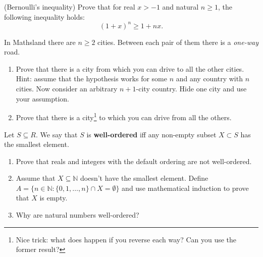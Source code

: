 \begin{prob}
	(Bernoulli's inequality) Prove that for real $x > -1$ and natural $n\ge 1$, the following inequality holds:
	$$(1+x)^n\ge 1+nx.$$
\end{prob}

\begin{prob}
	In Mathsland there are $n\ge 2$ cities. Between each pair of them there is a \textit{one-way} road.
	\begin{enumerate}
		\item Prove that there is a city from which you can drive to all the other cities. Hint: assume that the hypothesis works for some $n$ and any
			country with $n$ cities. Now consider an arbitrary $n+1$-city country. Hide one city and use your assumption.
		\item Prove that there is a city\footnote{Nice trick: what does happen if you reverse each way? Can you use the former result?}
			to which you can drive from all the others.
	\end{enumerate}
\end{prob}

\begin{prob}
	Let $S\subseteq R$. We say that $S$ is \textbf{well-ordered} iff any non-empty subset $X\subset S$ has the smallest element.
	\begin{enumerate}
		\item Prove that reals and integers with the default ordering are not well-ordered.
		\item Assume that $X\subseteq \mathbb N$ doesn't have the smallest element. Define $A=\{n\in \mathbb N : \{0,1,\dots,n\}\cap X=\emptyset\}$
			and use mathematical induction to prove that $X$ is empty.
		\item Why are natural numbers well-ordered?
	\end{enumerate}
\end{prob}
